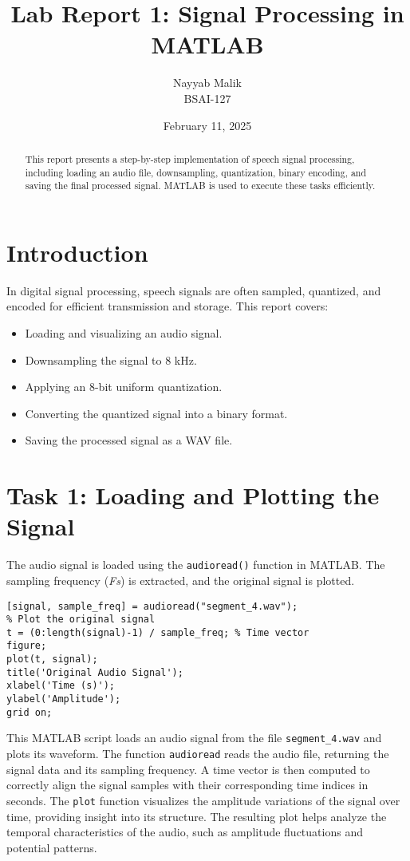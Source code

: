 \documentclass[a4paper,12pt]{article}
\title{\textbf{Lab Report 1: Signal Processing in MATLAB}}
\author{Nayyab Malik\\ BSAI-127}
\date{February 11, 2025}
\begin{document}
\maketitle
\tableofcontents
\newpage

\begin{abstract}
This report presents a step-by-step implementation of speech signal processing, including loading an audio file, downsampling, quantization, binary encoding, and saving the final processed signal. MATLAB is used to execute these tasks efficiently.
\end{abstract}

\section{Introduction}
In digital signal processing, speech signals are often sampled, quantized, and encoded for efficient transmission and storage. This report covers:
\begin{itemize}
    \item Loading and visualizing an audio signal.
    \item Downsampling the signal to 8 kHz.
    \item Applying an 8-bit uniform quantization.
    \item Converting the quantized signal into a binary format.
    \item Saving the processed signal as a WAV file.
\end{itemize}

\section{Task 1: Loading and Plotting the Signal}
The audio signal is loaded using the \texttt{audioread()} function in MATLAB. The sampling frequency (\textit{Fs}) is extracted, and the original signal is plotted.

\begin{lstlisting}[style=matlab, caption=Loading and Plotting Signal]
[signal, sample_freq] = audioread("segment_4.wav");
% Plot the original signal
t = (0:length(signal)-1) / sample_freq; % Time vector
figure;
plot(t, signal);
title('Original Audio Signal');
xlabel('Time (s)');
ylabel('Amplitude');
grid on;
\end{lstlisting}
This MATLAB script loads an audio signal from the file \texttt{segment\_4.wav} and plots its waveform. The function \texttt{audioread} reads the audio file, returning the signal data and its sampling frequency. A time vector is then computed to correctly align the signal samples with their corresponding time indices in seconds. The \texttt{plot} function visualizes the amplitude variations of the signal over time, providing insight into its structure. The resulting plot helps analyze the temporal characteristics of the audio, such as amplitude fluctuations and potential patterns.
\end{document}
